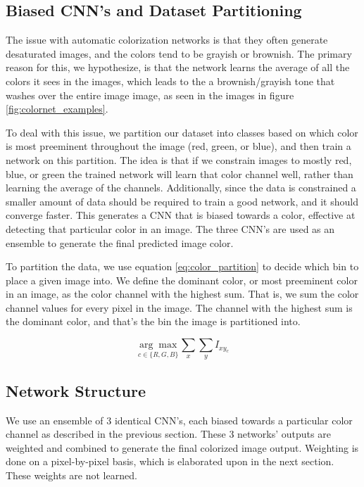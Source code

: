 \documentclass[10pt,twocolumn,letterpaper]{article}
\begin{document}
\subsection{Biased CNN's and Dataset Partitioning}

The issue with automatic colorization networks is that they often generate desaturated images, and the colors tend to be grayish or brownish. The primary reason for this, we hypothesize, is that the network learns the average of all the colors it sees in the images, which leads to the a brownish/grayish tone that washes over the entire image image, as seen in the images in figure \ref{fig:colornet_examples}.

To deal with this issue, we partition our dataset into classes based on which color is most preeminent throughout the image (red, green, or blue), and then train a network on this partition. The idea is that if we constrain images to mostly red, blue, or green the trained network will learn that color channel well, rather than learning the average of the channels. Additionally, since the data is constrained a smaller amount of data should be required to train a good network, and it should converge faster. This generates a CNN that is biased towards a color, effective at detecting that particular color in an image. The three CNN's are used as an ensemble to generate the final predicted image color.

To partition the data, we use equation \ref{eq:color_partition} to decide which bin to place a given image into. We define the dominant color, or most preeminent color in an image, as the color channel with the highest sum. That is, we sum the color channel values for every pixel in the image. The channel with the highest sum is the dominant color, and that's the bin the image is partitioned into.

\begin{equation}
    \underset{c \in \{R, G, B\}}{\arg\max} \sum_x \sum_y I_{xy_c}
    \label{eq:color_partition}
\end{equation}

\subsection{Network Structure}

We use an ensemble of 3 identical CNN's, each biased towards a particular color channel as described in the previous section. These 3 networks' outputs are weighted and combined to generate the final colorized image output. Weighting is done on a pixel-by-pixel basis, which is elaborated upon in the next section. These weights are not learned.
\end{document}
